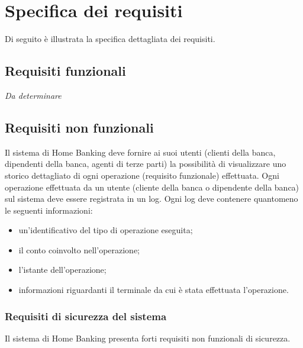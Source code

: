
\section{Specifica dei requisiti}

Di seguito \`e illustrata la specifica dettagliata dei requisiti.

\subsection{Requisiti funzionali}

\emph{Da determinare}

\subsection{Requisiti non funzionali}


Il sistema di Home Banking deve fornire ai suoi utenti (clienti della banca, dipendenti della banca, agenti di terze parti) la possibilit\`a di visualizzare uno storico dettagliato di ogni operazione (requisito funzionale) effettuata.
Ogni operazione effettuata da un utente (cliente della banca o dipendente della banca) sul sistema deve essere registrata in un log.
Ogni log deve contenere quantomeno le seguenti informazioni:
\begin{itemize}
	\item un'identificativo del tipo di operazione eseguita;
	\item il conto coinvolto nell'operazione;
	\item l'istante dell'operazione;
	\item informazioni riguardanti il terminale da cui \`e stata effettuata l'operazione.
\end{itemize}

\subsubsection{Requisiti di sicurezza del sistema}
 
Il sistema di Home Banking presenta forti requisiti non funzionali di sicurezza. 

